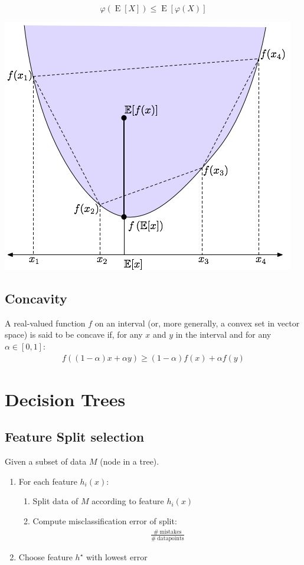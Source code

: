 \documentclass[8pt, a4paper, landscape, includeheadfoot]{extarticle}
\begin{document}
\begin{multicols*}{4}
	$$\varphi\left(\operatorname{E}[X]\right) \leq \operatorname{E} \left[ \varphi(X) \right]$$
	\begin{center}
		\includegraphics[width=0.8\linewidth]{0_images/jensen.png}
	\end{center}

	\subsection{Concavity}
	A real-valued function $f$	 on an interval (or, more generally, a convex set in vector space) is said to be concave if, for any $x$ and $y$ in the interval and for any $\alpha\in[0,1]$:
	\begin{align*}
		f((1-\alpha )x+\alpha y)\geq (1-\alpha ) f(x)+\alpha f(y)
	\end{align*}

	\section{Decision Trees}
	\subsection{Feature Split selection}
	Given a subset of data $M$ (node in a tree).
	\begin{enumerate}[itemsep=0pt]
		\item For each feature $h_i(x)$:
		      \begin{enumerate}
			      \item Split data of $M$ according to feature $h_i(x)$
			      \item Compute misclassification error of split:
			            \begin{align*}
				            \frac{\# \ \text{mistakes}}{\#\ \text{datapoints}}
			            \end{align*}
		      \end{enumerate}
		\item Choose feature $h^\star$ with lowest error
	\end{enumerate}


\end{multicols*}
\end{document}
